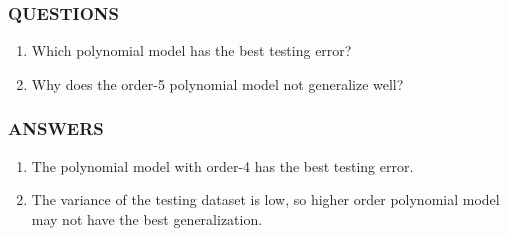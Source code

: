 \documentclass[11pt]{article}
\begin{document}
    \hypertarget{questions}{%
\subsubsection{QUESTIONS}\label{questions}}

\begin{enumerate}
\def\labelenumi{(\arabic{enumi})}
\item
  Which polynomial model has the best testing error?
\item
  Why does the order-5 polynomial model not generalize well?
\end{enumerate}

    \hypertarget{answers}{%
\subsubsection{ANSWERS}\label{answers}}

\begin{enumerate}
\def\labelenumi{(\arabic{enumi})}
\item
  The polynomial model with order-4 has the best testing error.
\item
  The variance of the testing dataset is low, so higher order polynomial
  model may not have the best generalization.
\end{enumerate}


    
    
    
    
\end{document}
